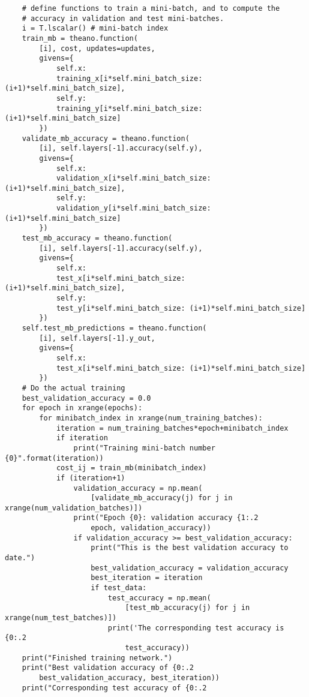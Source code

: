 \begin{lstlisting}
    # define functions to train a mini-batch, and to compute the
    # accuracy in validation and test mini-batches.
    i = T.lscalar() # mini-batch index
    train_mb = theano.function(
        [i], cost, updates=updates,
        givens={
            self.x:
            training_x[i*self.mini_batch_size: (i+1)*self.mini_batch_size],
            self.y: 
            training_y[i*self.mini_batch_size: (i+1)*self.mini_batch_size]
        })
    validate_mb_accuracy = theano.function(
        [i], self.layers[-1].accuracy(self.y),
        givens={
            self.x: 
            validation_x[i*self.mini_batch_size: (i+1)*self.mini_batch_size],
            self.y: 
            validation_y[i*self.mini_batch_size: (i+1)*self.mini_batch_size]
        })
    test_mb_accuracy = theano.function(
        [i], self.layers[-1].accuracy(self.y),
        givens={
            self.x: 
            test_x[i*self.mini_batch_size: (i+1)*self.mini_batch_size],
            self.y: 
            test_y[i*self.mini_batch_size: (i+1)*self.mini_batch_size]
        })
    self.test_mb_predictions = theano.function(
        [i], self.layers[-1].y_out,
        givens={
            self.x: 
            test_x[i*self.mini_batch_size: (i+1)*self.mini_batch_size]
        })
    # Do the actual training
    best_validation_accuracy = 0.0
    for epoch in xrange(epochs):
        for minibatch_index in xrange(num_training_batches):
            iteration = num_training_batches*epoch+minibatch_index
            if iteration 
                print("Training mini-batch number {0}".format(iteration))
            cost_ij = train_mb(minibatch_index)
            if (iteration+1) 
                validation_accuracy = np.mean(
                    [validate_mb_accuracy(j) for j in xrange(num_validation_batches)])
                print("Epoch {0}: validation accuracy {1:.2
                    epoch, validation_accuracy))
                if validation_accuracy >= best_validation_accuracy:
                    print("This is the best validation accuracy to date.")
                    best_validation_accuracy = validation_accuracy
                    best_iteration = iteration
                    if test_data:
                        test_accuracy = np.mean(
                            [test_mb_accuracy(j) for j in xrange(num_test_batches)])
                        print('The corresponding test accuracy is {0:.2
                            test_accuracy))
    print("Finished training network.")
    print("Best validation accuracy of {0:.2
        best_validation_accuracy, best_iteration))
    print("Corresponding test accuracy of {0:.2
\end{lstlisting}

